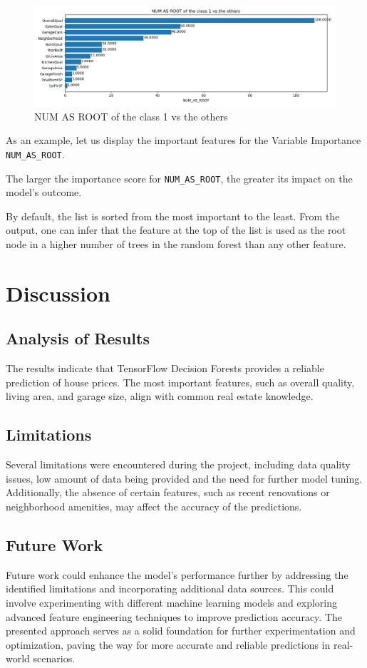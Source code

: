 \documentclass{article}
\begin{document}
\begin{figure}[h]
    \centering
    \includegraphics[width=1\linewidth]{variable_importance_lot.png}
    \caption{NUM AS ROOT of the class 1 vs the others}
    \label{NAR}
\end{figure}

As an example, let us display the important features for the Variable Importance \texttt{NUM\_AS\_ROOT}.

The larger the importance score for \texttt{NUM\_AS\_ROOT}, the greater its impact on the model's outcome.

By default, the list is sorted from the most important to the least. From the output, one can infer that the feature at the top of the list is used as the root node in a higher number of trees in the random forest than any other feature.


\section{Discussion}
\subsection{Analysis of Results}
The results indicate that TensorFlow Decision Forests provides a reliable prediction of house prices. The most important features, such as overall quality, living area, and garage size, align with common real estate knowledge.

\subsection{Limitations}
Several limitations were encountered during the project, including data quality issues, low amount of data being provided and the need for further model tuning. Additionally, the absence of certain features, such as recent renovations or neighborhood amenities, may affect the accuracy of the predictions.

\subsection{Future Work}
Future work could enhance the model's performance further by addressing the identified limitations and incorporating additional data sources. This could involve experimenting with different machine learning models and exploring advanced feature engineering techniques to improve prediction accuracy. The presented approach serves as a solid foundation for further experimentation and optimization, paving the way for more accurate and reliable predictions in real-world scenarios.
\end{document}
